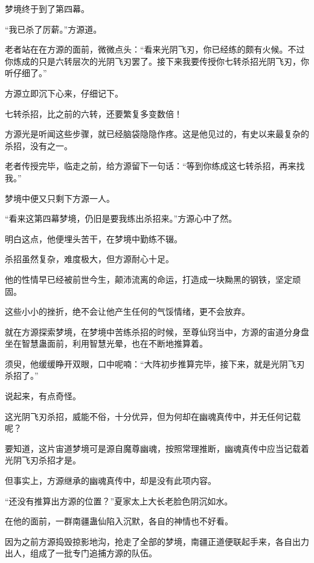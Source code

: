 
\begin{this_body}



梦境终于到了第四幕。

“我已杀了厉薪。”方源道。

老者站在在方源的面前，微微点头：“看来光阴飞刃，你已经练的颇有火候。不过你炼成的只是六转层次的光阴飞刃罢了。接下来我要传授你七转杀招光阴飞刃，你听仔细了。”

方源立即沉下心来，仔细记下。

七转杀招，比之前的六转，还要繁复多变数倍！

方源光是听闻这些步骤，就已经脑袋隐隐作疼。这是他见过的，有史以来最复杂的杀招，没有之一。

老者传授完毕，临走之前，给方源留下一句话：“等到你练成这七转杀招，再来找我。”

梦境中便又只剩下方源一人。

“看来这第四幕梦境，仍旧是要我练出杀招来。”方源心中了然。

明白这点，他便埋头苦干，在梦境中勤练不辍。

杀招虽然复杂，难度极大，但方源耐心十足。

他的性情早已经被前世今生，颠沛流离的命运，打造成一块黝黑的钢铁，坚定顽固。

这些小小的挫折，绝不会让他产生任何的气馁情绪，更不会放弃。

就在方源探索梦境，在梦境中苦练杀招的时候，至尊仙窍当中，方源的宙道分身盘坐在智慧蛊面前，利用智慧光晕，也在不断地推算着。

须臾，他缓缓睁开双眼，口中呢喃：“大阵初步推算完毕，接下来，就是光阴飞刃杀招了。”

说起来，有点奇怪。

这光阴飞刃杀招，威能不俗，十分优异，但为何却在幽魂真传中，并无任何记载呢？

要知道，这片宙道梦境可是源自魔尊幽魂，按照常理推断，幽魂真传中应当记载着光阴飞刃杀招才是。

但事实上，方源继承的幽魂真传中，却是没有此项内容。

“还没有推算出方源的位置？”夏家太上大长老脸色阴沉如水。

在他的面前，一群南疆蛊仙陷入沉默，各自的神情也不好看。

因为之前方源捣毁掠影地沟，抢走了全部的梦境，南疆正道便联起手来，各自出力出人，组成了一批专门追捕方源的队伍。


\end{this_body}

